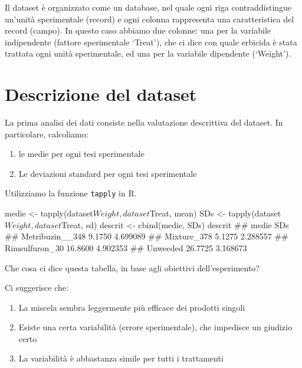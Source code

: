 \documentclass[a4paper,12pt,oneside]{book}
\providecommand{\tightlist}{%
  \setlength{\itemsep}{0pt}\setlength{\parskip}{0pt}}
\newenvironment{Shaded}{\begin{snugshade}}{\end{snugshade}}
\newcommand{\SpecialCharTok}[1]{#1}
\newcommand{\DocumentationTok}[1]{#1}
\newcommand{\OtherTok}[1]{#1}
\newcommand{\FunctionTok}[1]{#1}
\newcommand{\NormalTok}[1]{#1}
\begin{document}
Il dataset è organizzato come un database, nel quale ogni riga contraddistingue un'unità sperimentale (record) e ogni colonna rappresenta una caratteristica del record (campo). In questo caso abbiamo due colonne: una per la variabile indipendente (fattore sperimentale `Treat'), che ci dice con quale erbicida è stata trattata ogni unità sperimentale, ed una per la variabile dipendente (`Weight').

\hypertarget{descrizione-del-dataset}{%
\section{Descrizione del dataset}\label{descrizione-del-dataset}}

La prima analisi dei dati consiste nella valutazione descrittiva del dataset. In particolare, calcoliamo:

\begin{enumerate}
\def\labelenumi{\arabic{enumi}.}
\tightlist
\item
  le medie per ogni tesi sperimentale
\item
  Le deviazioni standard per ogni tesi sperimentale
\end{enumerate}

Utilizziamo la funzione \texttt{tapply} in R.

\begin{Shaded}
\begin{Highlighting}[]
\NormalTok{medie }\OtherTok{\textless{}{-}} \FunctionTok{tapply}\NormalTok{(dataset}\SpecialCharTok{$}\NormalTok{Weight, dataset}\SpecialCharTok{$}\NormalTok{Treat, mean)}
\NormalTok{SDs }\OtherTok{\textless{}{-}} \FunctionTok{tapply}\NormalTok{(dataset}\SpecialCharTok{$}\NormalTok{Weight, dataset}\SpecialCharTok{$}\NormalTok{Treat, sd)}
\NormalTok{descrit }\OtherTok{\textless{}{-}} \FunctionTok{cbind}\NormalTok{(medie, SDs)}
\NormalTok{descrit}
\DocumentationTok{\#\#                   medie      SDs}
\DocumentationTok{\#\# Metribuzin\_\_348  9.1750 4.699089}
\DocumentationTok{\#\# Mixture\_378      5.1275 2.288557}
\DocumentationTok{\#\# Rimsulfuron\_30  16.8600 4.902353}
\DocumentationTok{\#\# Unweeded        26.7725 3.168673}
\end{Highlighting}
\end{Shaded}

Che cosa ci dice questa tabella, in base agli obiettivi dell'esperimento?

Ci suggerisce che:

\begin{enumerate}
\def\labelenumi{\arabic{enumi}.}
\tightlist
\item
  La miscela sembra leggermente più efficace dei prodotti singoli
\item
  Esiste una certa variabilità (errore sperimentale), che impedisce un giudizio certo
\item
  La variabilità è abbastanza simile per tutti i trattamenti
\end{enumerate}
\end{document}

